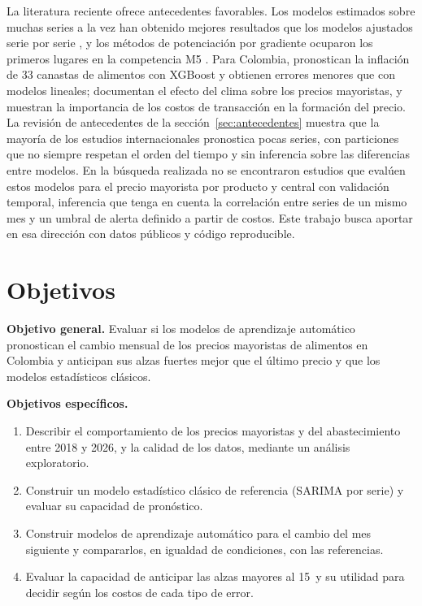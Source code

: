 La literatura reciente ofrece antecedentes favorables. Los modelos estimados sobre muchas series a la vez han obtenido mejores resultados que los modelos ajustados serie por serie \citep{montero2021}, y los métodos de potenciación por gradiente ocuparon los primeros lugares en la competencia M5 \citep{m5,januschowski2022}. Para Colombia, \citet{anzola2025} pronostican la inflación de 33 canastas de alimentos con XGBoost y obtienen errores menores que con modelos lineales; \citet{bohorquez2026} documentan el efecto del clima sobre los precios mayoristas, y \citet{gafaro2020} muestran la importancia de los costos de transacción en la formación del precio. La revisión de antecedentes de la sección~\ref{sec:antecedentes} muestra que la mayoría de los estudios internacionales pronostica pocas series, con particiones que no siempre respetan el orden del tiempo y sin inferencia sobre las diferencias entre modelos. En la búsqueda realizada no se encontraron estudios que evalúen estos modelos para el precio mayorista por producto y central con validación temporal, inferencia que tenga en cuenta la correlación entre series de un mismo mes y un umbral de alerta definido a partir de costos. Este trabajo busca aportar en esa dirección con datos públicos y código reproducible.

\section{Objetivos}

\textbf{Objetivo general.} Evaluar si los modelos de aprendizaje automático pronostican el cambio mensual de los precios mayoristas de alimentos en Colombia y anticipan sus alzas fuertes mejor que el último precio y que los modelos estadísticos clásicos.

\textbf{Objetivos específicos.}
\begin{enumerate}[label=O\arabic*.,nosep]
\item Describir el comportamiento de los precios mayoristas y del abastecimiento entre 2018 y 2026, y la calidad de los datos, mediante un análisis exploratorio.
\item Construir un modelo estadístico clásico de referencia (SARIMA por serie) y evaluar su capacidad de pronóstico.
\item Construir modelos de aprendizaje automático para el cambio del mes siguiente y compararlos, en igualdad de condiciones, con las referencias.
\item Evaluar la capacidad de anticipar las alzas mayores al 15\pct\ y su utilidad para decidir según los costos de cada tipo de error.
\end{enumerate}

